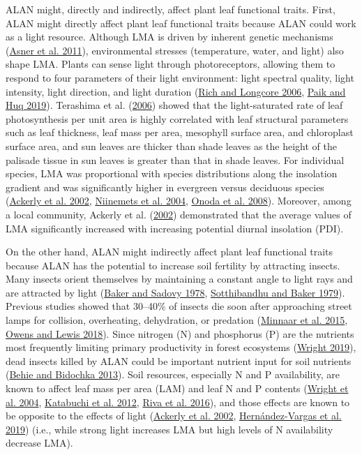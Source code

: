 \documentclass[
  12pt,
  letterpaper,
  DIV=11,
  numbers=noendperiod]{scrartcl}
\begin{document}
ALAN might, directly and indirectly, affect plant leaf functional
traits. First, ALAN might directly affect plant leaf functional traits
because ALAN could work as a light resource. Although LMA is driven by
inherent genetic mechanisms (\protect\hyperlink{ref-Asner2011}{Asner et
al. 2011}), environmental stresses (temperature, water, and light) also
shape LMA. Plants can sense light through photoreceptors, allowing them
to respond to four parameters of their light environment: light spectral
quality, light intensity, light direction, and light duration
(\protect\hyperlink{ref-Rich2006}{Rich and Longcore 2006},
\protect\hyperlink{ref-Paik2019}{Paik and Huq 2019}). Terashima et al.
(\protect\hyperlink{ref-Terashima2006}{2006}) showed that the
light-saturated rate of leaf photosynthesis per unit area is highly
correlated with leaf structural parameters such as leaf thickness, leaf
mass per area, mesophyll surface area, and chloroplast surface area, and
sun leaves are thicker than shade leaves as the height of the palisade
tissue in sun leaves is greater than that in shade leaves. For
individual species, LMA was proportional with species distributions
along the insolation gradient and was significantly higher in evergreen
versus deciduous species (\protect\hyperlink{ref-Ackerly2002}{Ackerly et
al. 2002}, \protect\hyperlink{ref-Niinemets2004}{Niinemets et al. 2004},
\protect\hyperlink{ref-Onoda2008}{Onoda et al. 2008}). Moreover, among a
local community, Ackerly et al.
(\protect\hyperlink{ref-Ackerly2002}{2002}) demonstrated that the
average values of LMA significantly increased with increasing potential
diurnal insolation (PDI).

On the other hand, ALAN might indirectly affect plant leaf functional
traits because ALAN has the potential to increase soil fertility by
attracting insects. Many insects orient themselves by maintaining a
constant angle to light rays and are attracted by light
(\protect\hyperlink{ref-Baker1978}{Baker and Sadovy 1978},
\protect\hyperlink{ref-Sotthibandhu1979}{Sotthibandhu and Baker 1979}).
Previous studies showed that 30--40\% of insects die soon after
approaching street lamps for collision, overheating, dehydration, or
predation (\protect\hyperlink{ref-Minnaar2015}{Minnaar et al. 2015},
\protect\hyperlink{ref-Owens2018}{Owens and Lewis 2018}). Since nitrogen
(N) and phosphorus (P) are the nutrients most frequently limiting
primary productivity in forest ecosystems
(\protect\hyperlink{ref-Wright2019}{Wright 2019}), dead insects killed
by ALAN could be important nutrient input for soil nutrients
(\protect\hyperlink{ref-Behie2013}{Behie and Bidochka 2013}). Soil
resources, especially N and P availability, are known to affect leaf
mass per area (LAM) and leaf N and P contents
(\protect\hyperlink{ref-Wright2004}{Wright et al. 2004},
\protect\hyperlink{ref-Katabuchi2012}{Katabuchi et al. 2012},
\protect\hyperlink{ref-Riva2016}{Riva et al. 2016}), and those effects
are known to be opposite to the effects of light
(\protect\hyperlink{ref-Ackerly2002}{Ackerly et al. 2002},
\protect\hyperlink{ref-Hernandez-Vargas2019}{Hernández-Vargas et al.
2019}) (i.e., while strong light increases LMA but high levels of N
availability decrease LMA).
\end{document}
